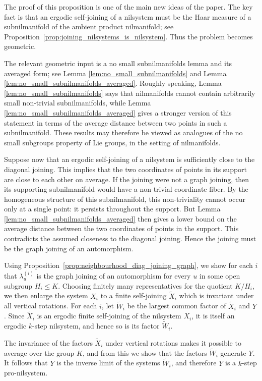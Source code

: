 \documentclass[12pt]{amsart}
\theoremstyle{plain}
\theoremstyle{definition}
\begin{document}
The proof of this proposition is one of the main new ideas of the paper. 
The key fact is that an ergodic self-joining of a nilsystem must be the Haar measure of a subnilmanifold of the ambient product nilmanifold; see Proposition~\ref{prop:joining_nilsystems_is_nilsystem}.
Thus the problem becomes geometric.

The relevant geometric input is a no small subnilmanifolds lemma and its averaged form; see Lemma \ref{lem:no_small_subnilmanifolds} and Lemma \ref{lem:no_small_subnilmanifolds_averaged}.
Roughly speaking, Lemma \ref{lem:no_small_subnilmanifolds} says that nilmanifolds cannot contain arbitrarily small non-trivial subnilmanifolds, while Lemma \ref{lem:no_small_subnilmanifolds_averaged} gives a stronger version of this statement in terms of the average distance between two points in such a subnilmanifold. 
These results may therefore be viewed as analogues of the no small subgroups property of Lie groups, in the setting of nilmanifolds.

Suppose now that an ergodic self-joining of a nilsystem is sufficiently close to the diagonal joining.
This implies that the two coordinates of points in its support are close to each other on average.
If the joining were not a graph joining, then its supporting subnilmanifold would have a non-trivial coordinate fiber.
By the homogeneous structure of this subnilmanifold, this non-triviality cannot occur only at a single point: it persists throughout the support. 
But Lemma \ref{lem:no_small_subnilmanifolds_averaged} then gives a lower bound on the average distance between the two coordinates of points in the support.
This contradicts the assumed closeness to the diagonal joining.
Hence the joining must be the graph joining of an automorphism.

Using Proposition~\ref{prop:neighbourhood_diag_joining_graph}, we show for each $i$ that $\lambda_u^{(i)}$ is the graph joining of an automorphism for every $u$ in some open subgroup $H_i \leq K$. Choosing finitely many representatives for the quotient $K/H_i$, we then enlarge the system $X_i$ to a finite self-joining $\widetilde X_i$ which is invariant under all vertical rotations. For each $i$, let $\widetilde W_i$ be the largest common factor of $\widetilde X_i$ and $Y$. Since $\widetilde X_i$ is an ergodic finite self-joining of the nilsystem $X_i$, it is itself an ergodic $k$-step nilsystem, and hence so is its factor $\widetilde W_i$.

The invariance of the factors $\widetilde X_i$ under vertical rotations makes it possible to average over the group $K$, and from this we show that the factors $\widetilde W_i$ generate $Y$. It follows that $Y$ is the inverse limit of the systems $\widetilde W_i$, and therefore $Y$ is a $k$-step pro-nilsystem.
\end{document}
